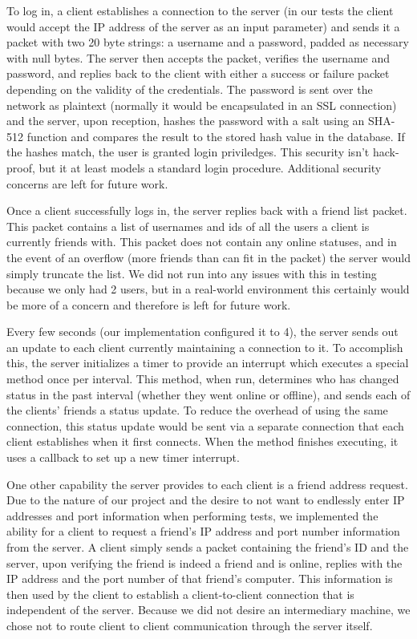 To log in, a client establishes a connection to the server (in our tests
the client would accept the IP address of the server as an input parameter) and sends it
a packet with two 20 byte strings: a username and a password, padded as necessary with
null bytes. The server then accepts the packet, verifies the username and password, and
replies back to the client with either a success or failure packet depending on the
validity of the credentials. The password is sent over the network as plaintext (normally
it would be encapsulated in an SSL connection) and the server, upon reception, hashes
the password with a salt using an SHA-512 function and compares the result to the stored hash value 
in the database. If the hashes match, the user is granted login priviledges. This
security isn't hack-proof, but it at least models a standard login procedure.  Additional
security concerns are left for future work.

Once a client successfully logs in, the server replies back with a friend list packet.
This packet contains a list of usernames and ids of all the users a client is currently
friends with. This packet does not contain any online statuses, and in the event of
an overflow (more friends than can fit in the packet) the server would simply truncate
the list. We did not run into any issues with this in testing because we only had 2
users, but in a real-world environment this certainly would be more of a concern and 
therefore is left for future work.

Every few seconds (our implementation configured it to 4), the server sends out an
update to each client currently maintaining a connection to it. To accomplish this,
the server initializes a timer to provide an interrupt which executes a special method
once per interval. This method, when run, determines who has changed status in the past
interval (whether they went online or offline), and sends each of the clients' friends a 
status update. To reduce the overhead of using the same
connection, this status update would be sent via a separate connection that each client
establishes when it first connects. When the method finishes executing, it uses a callback
to set up a new timer interrupt. 

One other capability the server provides to each client is a friend address request. Due to
the nature of our project and the desire to not want to endlessly enter IP addresses and
port information
when performing tests, we implemented the ability for a client to request a friend's IP 
address and port number
information from the server. A client simply sends a packet containing the friend's ID and 
the server, upon verifying the friend is indeed a friend and is online, replies with the
IP address and the port number of that friend's computer. This information is then used
by the client to establish a client-to-client connection that is independent of the 
server. Because we did not desire an intermediary machine, we chose not to route client to client
communication through the server itself.

